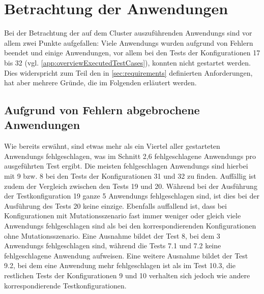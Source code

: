 \section{Betrachtung der Anwendungen}
\label{sec:appEval}

Bei der Betrachtung der auf dem Cluster auszuführenden \glspl{Anwendung} sind vor allem zwei Punkte aufgefallen:
Viele \glspl{Anwendung} wurden aufgrund von Fehlern beendet und einige Anwendungen, vor allem bei den \glspl{Test} der Konfigurationen 17 bis 32 (vgl. \cref{app:overviewExecutedTestCases}), konnten nicht gestartet werden.
Dies widerspricht zum Teil den in \cref{sec:requirements} definierten Anforderungen, hat aber mehrere Gründe, die im Folgenden erläutert werden.

\subsection{Aufgrund von Fehlern abgebrochene Anwendungen}
\label{subsec:failedApps}

Wie bereits erwähnt, sind etwas mehr als ein Viertel aller gestarteten \glspl{Anwendung} fehlgeschlagen, was im Schnitt 2,6 fehlgeschlagene \glspl{Anwendung} pro ausgeführten \gls{Test} ergibt.
Die meisten fehlgeschlagen \glspl{Anwendung} sind hierbei mit 9 bzw. 8 bei den \glspl{Test} der Konfigurationen 31 und 32 zu finden.
Auffällig ist zudem der Vergleich zwischen den \glspl{Test} 19 und 20.
Während bei der Ausführung der \gls{Testkonfiguration} 19 ganze 5 \glspl{Anwendung} fehlgeschlagen sind, ist dies bei der Ausführung des Tests 20 keine einzige.
Ebenfalls auffallend ist, dass bei Konfigurationen mit Mutationsszenario fast immer weniger oder gleich viele \glspl{Anwendung} fehlgeschlagen sind als bei den korrespondierenden Konfigurationen ohne Mutationsszenario.
Eine Ausnahme bildet der \gls{Test} 8, bei dem 3 \glspl{Anwendung} fehlgeschlagen sind, während die Tests 7.1 und 7.2 keine fehlgeschlagene Anwendung aufweisen.
Eine weitere Ausnahme bildet der \gls{Test} 9.2, bei dem eine \gls{Anwendung} mehr fehlgeschlagen ist als im \gls{Test} 10.3, die restlichen \glspl{Test} der Konfigurationen 9 und 10 verhalten sich jedoch wie andere korrespondierende Testkonfigurationen.

